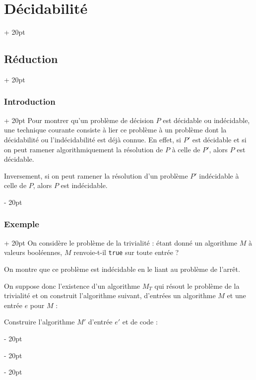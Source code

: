 \documentclass[a4paper, 12pt, twoside]{article}
\newcommand{\ind}[1][20pt]{\advance\leftskip + #1}
\newcommand{\deind}[1][20pt]{\advance\leftskip - #1}
\newenvironment{indt}[2][20pt]{#2 \par \ind[#1]}{\par \deind} %
\begin{document}
\begin{indt}{\section{Décidabilité}}
        \begin{indt}{\subsection{Réduction}}
            \begin{indt}{\subsubsection{Introduction}}
                Pour montrer qu'un problème de décision $P$ est décidable ou indécidable, une technique courante consiste à lier ce problème à un problème dont la décidabilité ou l'indécidabilité est déjà connue.
                En effet, si $P'$ est décidable et si on peut ramener algorithmiquement la résolution de $P$ à celle de $P'$, alors $P$ est décidable.

                Inversement, si on peut ramener la résolution d'un problème $P'$ indécidable à celle de $P$, alors $P$ est indécidable.
            \end{indt}

            \vspace{12pt}
            
            \begin{indt}{\subsubsection{Exemple}}
                On considère le problème de la trivialité : étant donné un algorithme $M$ à valeurs booléennes, $M$ renvoie-t-il \texttt{true} sur toute entrée ?

                On montre que ce problème est indécidable en le liant au problème de l'arrêt.

                On suppose donc l'existence d'un algorithme $M_T$ qui résout le problème de la trivialité et on construit l'algorithme suivant, d'entrées un algorithme $M$ et une entrée $e$ pour $M$ :

                \begin{algoBox}
                    \begin{algorithm}[H]
                    
                        \BlankLine

                        Construire l'algorithme $M'$ d'entrée $e'$ et de code :

                        \setcounter{algocf}{3}
                        \begin{algorithm}[H]


\end{algorithm}
\end{algorithm}
\end{algoBox}
\end{indt}
\end{indt}
\end{indt}
\end{document}
